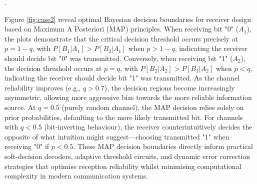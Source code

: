 .\documentclass[a4paper,11pt]{article}
\begin{document}
\vspace{-10pt}
Figure \ref{fig:case2} reveal optimal Bayesian decision boundaries for receiver design based on Maximum A Posteriori (MAP) principles. When receiving bit "0" ($A_{1}$), the plots demonstrate that the critical decision threshold occurs precisely at $p = 1 - q$, with $P[B_{1}|A_{1}] > P[B_{2}|A_{1}]$ when $p > 1 - q$, indicating the receiver should decide bit "0" was transmitted. Conversely, when receiving bit "1" ($A_{2}$), the decision threshold occurs at $p = q$, with $P[B_{2}|A_{2}] > P[B_{1}|A_{2}]$ when $p < q$, indicating the receiver should decide bit "1" was transmitted. As the channel reliability improves (e.g., $q > 0.7$), the decision regions become increasingly asymmetric, allowing more aggressive bias towards the more reliable information source. At $q = 0.5$ (purely random channel), the MAP decision relies solely on prior probabilities, defaulting to the more likely transmitted bit. For channels with $q < 0.5$ (bit-inverting behaviour), the receiver counterintuitively decides the opposite of what intuition might suggest—choosing transmitted "1" when receiving "0" if $p < 0.5$. These MAP decision boundaries directly inform practical soft-decision decoders, adaptive threshold circuits, and dynamic error correction strategies that optimise reception reliability whilst minimising computational complexity in modern communication systems.
 
\end{document}
